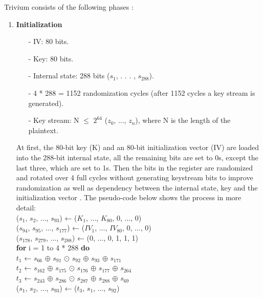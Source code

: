 	Trivium consists of the following phases \cite{canniere2008trivium}:
	\begin{enumerate}
		\item \textbf{Initialization}
		\begin{itemize}
			\setlength\itemsep{0.1em}
			\item[-] IV: 80 bits.
			\item[-] Key: 80 bits.
			\item[-] Internal state: 288 bits ($s_1$, . . . , $s_{288}$). 
			\item[-] 4 * 288 = 1152 randomization cycles (after 1152 cycles a key stream is generated).
			\item[-] Key stream: N $\leq$ $2^{64}$ ($z_0$, ..., $z_n$), where N is the length of the plaintext.
		\end{itemize}
		At first, the  80-bit key (K) and an 80-bit initialization vector (IV) are loaded into the 288-bit internal state, all the remaining bits are set to 0s, except the last three, which are set to 1s. Then the bits in the register are randomized and rotated over 4 full cycles without generating keystream bits to improve randomization as well as dependency between the internal state, key and the initialization vector .
		The pseudo-code below shows the process in more detail:
		\vspace{0.5em}
		\\
		{\selectfont
			($s_1$, $s_2$, ..., $s_93$) ← ($K_1$, ..., $K_{80}$, 0, ..., 0)\\
			($s_{94}$, $s_{95}$, ..., $s_{177}$) ← ($IV_1$, ..., $IV_{80}$, 0, ..., 0)\\
			($s_{178}$, $s_{279}$, ..., $s_{288}$) ← (0, ..., 0, 1, 1, 1)\\
			\textbf{for} i = 1 to 4 * 288 \textbf{do} \\
			\indent\hspace{1cm}$t_1$ ← $s_{66}$ $\oplus$ $s_{91}$ $\odot$ $s_{92}$ $\oplus$ $s_{93}$ $\oplus$ $s_{171}$\\
			\indent\hspace{1cm} $t_2$ ← $s_{162}$ $\oplus$ $s_{175}$ $\odot$ $s_{176}$ $\oplus$ $s_{177}$ $\oplus$ $s_{264}$\\
			\indent\hspace{1cm} $t_3$ ← $s_{243}$ $\oplus$ $s_{286}$ $\odot$ $s_{287}$ $\oplus$ $s_{288}$ $\oplus$ $s_{69}$\\
			\indent\hspace{1cm}($s_1$, $s_2$, ..., $s_{93}$) ← ($t_3$, $s_1$, ..., $s_{92}$)\\
}
\end{enumerate}

